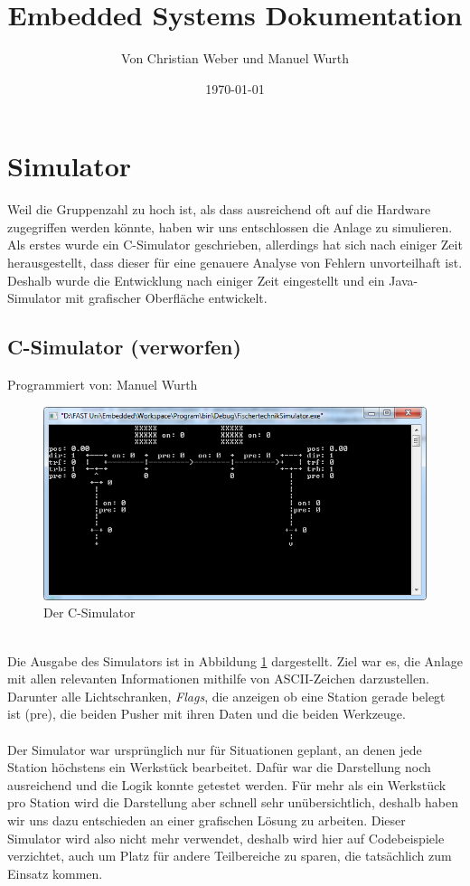 \documentclass[fontsize=11pt,a4paper,final]{scrartcl}[2003/01/01]
\title{Embedded Systems Dokumentation}
\author{Von Christian Weber und Manuel Wurth}
\date{\today}
\makeatletter
\def\ScaleIfNeeded{%
	\ifdim\Gin@nat@width>\linewidth
		\linewidth
	\else
		\Gin@nat@width
	\fi
}
\newcommand*{\manu}{%
	Programmiert von: Manuel Wurth
}
\makeatother
\begin{document}
	
\maketitle
\newpage
\tableofcontents
\newpage

\section{Simulator}
Weil die Gruppenzahl zu hoch ist, als dass ausreichend oft auf die Hardware zugegriffen werden könnte, haben wir uns entschlossen die Anlage zu simulieren. Als erstes wurde ein C-Simulator geschrieben, allerdings hat sich nach einiger Zeit herausgestellt, dass dieser für eine genauere Analyse von Fehlern unvorteilhaft ist. 
Deshalb wurde die Entwicklung nach einiger Zeit eingestellt und ein Java-Simulator mit grafischer Oberfläche entwickelt.




\subsection{C-Simulator (verworfen)}
\manu

\begin{figure}[H]
	\centering
	\includegraphics[width=1\ScaleIfNeeded]{Bilder/C-Simulator.png}
	\caption{Der C-Simulator}
	\label{fig:C-Simulator}
\end{figure} \ \\
\noindent Die Ausgabe des Simulators ist in Abbildung \ref{fig:C-Simulator} dargestellt. Ziel war es, die Anlage mit allen relevanten Informationen mithilfe von ASCII-Zeichen darzustellen. Darunter alle Lichtschranken, \textit{Flags}, die anzeigen ob eine Station gerade belegt ist (pre), die beiden Pusher mit ihren Daten und die beiden Werkzeuge. \\ \\
Der Simulator war ursprünglich nur für Situationen geplant, an denen jede Station höchstens ein Werkstück bearbeitet. Dafür war die Darstellung noch ausreichend und die Logik konnte getestet werden. Für mehr als ein Werkstück pro Station wird die Darstellung aber schnell sehr unübersichtlich, deshalb haben wir uns dazu entschieden an einer grafischen Lösung zu arbeiten. Dieser Simulator wird also nicht mehr verwendet, deshalb wird hier auf Codebeispiele verzichtet, auch um Platz für andere Teilbereiche zu sparen, die tatsächlich zum Einsatz kommen.
\end{document}
